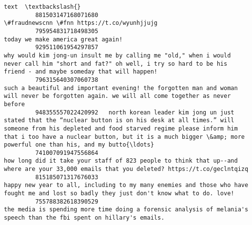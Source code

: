 \documentclass[11pt]{article}
\begin{document}
\begin{Verbatim}[commandchars=\\\{\}]
                                                                                                                                                                                                                                                                                                                 text  \textbackslash{}
         881503147168071680                                                                                                                                                                                                                                                \#fraudnewscnn \#fnn https://t.co/wyunhjjujg   
         795954831718498305                                                                                                                                                                                                                                                        today we make america great again!   
         929511061954297857                                                                                                           why would kim jong-un insult me by calling me "old," when i would never call him "short and fat?" oh well, i try so hard to be his friend - and maybe someday that will happen!   
         796315640307060738                                                                                                                                              such a beautiful and important evening! the forgotten man and woman will never be forgotten again. we will all come together as never before   
         948355557022420992   north korean leader kim jong un just stated that the “nuclear button is on his desk at all times.” will someone from his depleted and food starved regime please inform him that i too have a nuclear button, but it is a much bigger \&amp; more powerful one than his, and my butto{\ldots}   
         741007091947556864                                                                                                                                                how long did it take your staff of 823 people to think that up--and where are your 33,000 emails that you deleted? https://t.co/geclntqizq   
         815185071317676033                                                                                                                                                 happy new year to all, including to my many enemies and those who have fought me and lost so badly they just don't know what to do. love!   
         755788382618390529                                                                                                                                                                     the media is spending more time doing a forensic analysis of melania's speech than the fbi spent on hillary's emails.   

\end{Verbatim}
\end{document}
